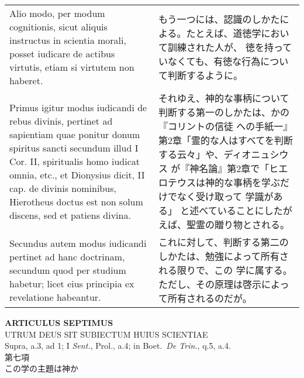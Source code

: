 \documentclass[10pt]{jsarticle} %
\begin{document}
\begin{longtable}{p{21em}p{21em}}
Alio modo, per modum cognitionis, sicut aliquis instructus in
scientia morali, posset iudicare de actibus virtutis, etiam si virtutem
non haberet. 

&

もう一つには、認識のしかたによる。たとえば、道徳学において訓練された人が、
徳を持っていなくても、有徳な行為について判断するように。

\\

Primus igitur modus iudicandi de rebus divinis, pertinet ad
sapientiam quae ponitur donum spiritus sancti secundum illud I Cor. II,
spiritualis homo iudicat omnia, etc., et Dionysius dicit, II cap. de
divinis nominibus, Hierotheus doctus est non solum discens, sed et
patiens divina. 

&

それゆえ、神的な事柄について判断する第一のしかたは、かの『コリントの信徒
 への手紙一』第2章「霊的な人はすべてを判断する云々」や、ディオニュシウス
 が『神名論』第2章で「ヒエロテウスは神的な事柄を学ぶだけでなく受け取って
 学識がある」 と述べていることにしたがえば、聖霊の贈り物とされる。


\\

Secundus autem modus iudicandi pertinet ad hanc
doctrinam, secundum quod per studium habetur; licet eius principia ex
revelatione habeantur.


&

これに対して、判断する第二のしかたは、勉強によって所有される限りで、この
 学に属する。ただし、その原理は啓示によって所有されるのだが。


\end{longtable}
\newpage

\begin{center}
 {\Large {\bf ARTICULUS SEPTIMUS}}\\
 {\large UTRUM DEUS SIT SUBIECTUM HUIUS SCIENTIAE}\\
 {\footnotesize Supra, a.3, ad 1; I {\itshape Sent.}, Prol., a.4; in
 Boet.~{\itshape De Trin.}, q.5, a.4.}\\
 {\Large 第七項\\この学の主題は神か}
\end{center}
\end{document}
